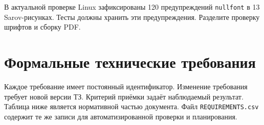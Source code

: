 \documentclass[11pt,a4paper,oneside]{scrreprt}
\begin{document}
В актуальной проверке Linux зафиксированы 120 предупреждений \texttt{nullfont} в 13 Sarov-рисунках. Тесты должны хранить эти предупреждения. Разделите проверку шрифтов и сборку PDF.

\chapter{Формальные технические требования}\label{ux444ux43eux440ux43cux430ux43bux44cux43dux44bux435-ux442ux435ux445ux43dux438ux447ux435ux441ux43aux438ux435-ux442ux440ux435ux431ux43eux432ux430ux43dux438ux44f}

Каждое требование имеет постоянный идентификатор. Изменение требования требует новой версии ТЗ. Критерий приёмки задаёт наблюдаемый результат. Таблица ниже является нормативной частью документа. Файл \texttt{REQUIREMENTS.csv} содержит те же записи для автоматизированной проверки и планирования.
\end{document}
